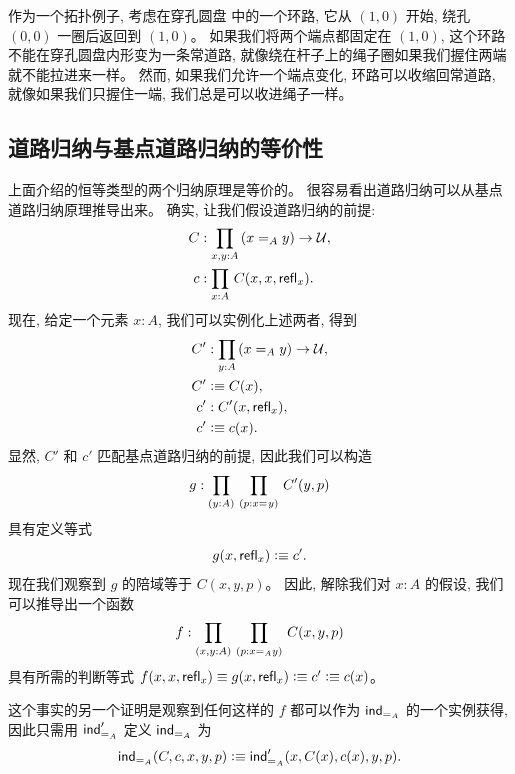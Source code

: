 \begin{rmk}
作为一个拓扑例子, 考虑在穿孔圆盘  中的一个环路, 它从 $(1,0)$ 开始, 绕孔 $(0,0)$ 一圈后返回到 $(1,0)$。
如果我们将两个端点都固定在 $(1,0)$, 这个环路不能在穿孔圆盘内形变为一条常道路, 就像绕在杆子上的绳子圈如果我们握住两端就不能拉进来一样。
然而, 如果我们允许一个端点变化, 环路可以收缩回常道路, 就像如果我们只握住一端, 我们总是可以收进绳子一样。
\end{rmk}

%
%

\subsection{道路归纳与基点道路归纳的等价性}

上面介绍的恒等类型的两个归纳原理是等价的。
很容易看出道路归纳可以从基点道路归纳原理推导出来。
确实, 让我们假设道路归纳的前提:
\begin{align*}
C &: \prd{x,y:A}(\id[A]{x}{y}) \to \UU,\\
c &: \prd{x:A} C(x,x,\refl{x}).
\end{align*}
现在, 给定一个元素 $x:A$, 我们可以实例化上述两者, 得到
\begin{align*}
C' &: \prd{y:A} (\id[A]{x}{y}) \to \UU,  \\
C' &\defeq C(x), \\
c' &: C'(x,\refl{x}), \\
c' &\defeq c(x).
\end{align*}
显然, $C'$ 和 $c'$ 匹配基点道路归纳的前提, 因此我们可以构造
\begin{equation*}
  g : \prd{y:A}{p : \id{x}{y}} C'(y,p)
\end{equation*}
具有定义等式
\[ g(x,\mathsf{refl}_{x}) \vcentcolon\equiv c'.\]
现在我们观察到 $g$ 的陪域等于 $C(x,y,p)$。
因此, 解除我们对 $x:A$ 的假设, 我们可以推导出一个函数
\[ f : \prd{x,y:A}{p : \id[A]{x}{y}} C(x,y,p) \]
具有所需的判断等式 $f(x,x,\mathsf{refl}_{x}) \equiv g(x,\mathsf{refl}_{x}) \vcentcolon\equiv c' \vcentcolon\equiv c(x)$。

这个事实的另一个证明是观察到任何这样的 $f$ 都可以作为 $\mathsf{ind}_{=_{A}}$ 的一个实例获得, 因此只需用 $\mathsf{ind}_{=_{A}}'$ 定义 $\mathsf{ind}_{=_{A}}$ 为
\[ \mathsf{ind}_{=_{A}}(C,c,x,y,p) \vcentcolon\equiv \mathsf{ind}_{=_{A}}'(x,C(x),c(x),y,p). \]

